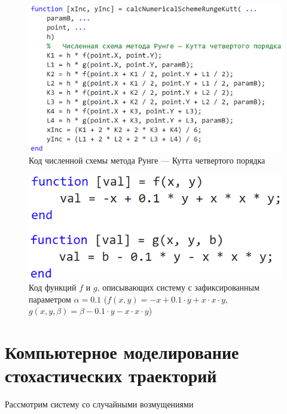 \documentclass[a4paper, 14pt]{article}
\begin{document}
			\begin{figure}[!ht]
				\begin{center}
					\includegraphics[scale=0.35]{img/codeRK.png}\caption{Код численной схемы метода Рунге — Кутта четвертого порядка}
				\end{center}
			\end{figure}
			
			\begin{figure}[!ht]
				\begin{center}
					\includegraphics[scale=0.35]{img/code_f_g.png}\caption{Код функций $f$ и $g$, описывающих систему с зафиксированным параметром $\alpha = 0.1$ ($f(x, y) = -x + 0.1 \cdot y + x \cdot x \cdot y$, $g(x, y, \beta) = \beta - 0.1 \cdot y - x \cdot x \cdot y$)}
				\end{center}
			\end{figure}
		
		\newpage
		
	\section{Компьютерное моделирование	стохастических траекторий}
	
		Рассмотрим систему со случайными возмущениями
		
\end{document}
